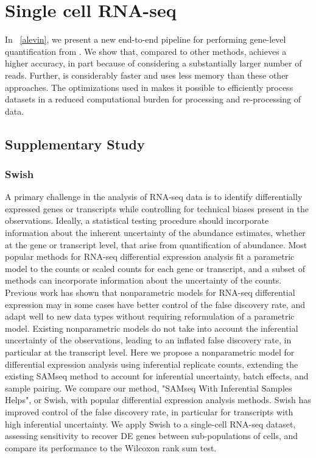 \section{Single cell RNA-seq}
In ~\cref{alevin}, we present a new end-to-end pipeline for performing gene-level 
quantification from \dscrnaseq. We show that, compared to other methods, \alevin achieves
a higher accuracy, in part because of considering a substantially larger number
of reads. Further, \alevin is considerably faster and uses less memory than
these other approaches. The optimizations used in \alevin makes it possible to 
efficiently process \dscrnaseq datasets in a reduced computational burden for 
processing and re-processing of \dscrnaseq data.

\subsection{Supplementary Study}
\subsubsection{Swish ~\citep{zhu2019nonparametric}}
A primary challenge in the analysis of RNA-seq data is to identify differentially 
expressed genes or transcripts while controlling for technical biases present in 
the observations. Ideally, a statistical testing procedure should incorporate 
information about the inherent uncertainty of the abundance estimates, whether at 
the gene or transcript level, that arise from quantification of abundance. Most 
popular methods for RNA-seq differential expression analysis fit a parametric model 
to the counts or scaled counts for each gene or transcript, and a subset of methods 
can incorporate information about the uncertainty of the counts. Previous work has 
shown that nonparametric models for RNA-seq differential expression may in some cases 
have better control of the false discovery rate, and adapt well to new data types 
without requiring reformulation of a parametric model. Existing nonparametric models 
do not take into account the inferential uncertainty of the observations, leading to 
an inflated false discovery rate, in particular at the transcript level. Here we 
propose a nonparametric model for differential expression analysis using inferential 
replicate counts, extending the existing SAMseq method to account for inferential 
uncertainty, batch effects, and sample pairing. We compare our method, 
"SAMseq With Inferential Samples Helps", or Swish, with popular differential 
expression analysis methods. Swish has improved control of the false discovery rate, 
in particular for transcripts with high inferential uncertainty. We apply Swish to 
a single-cell RNA-seq dataset, assessing sensitivity to recover DE genes between 
sub-populations of cells, and compare its performance to the Wilcoxon rank sum test.

